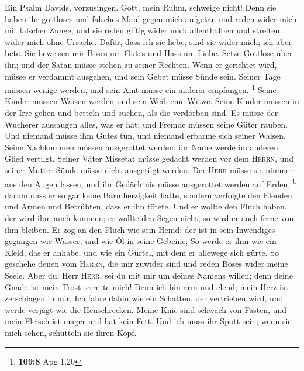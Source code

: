  Ein Psalm Davids, vorzusingen. Gott, mein Ruhm, schweige
nicht!  Denn sie haben ihr gottloses und falsches Maul
gegen mich aufgetan und reden wider mich mit falscher Zunge;
 und sie reden giftig wider mich allenthalben und streiten
wider mich ohne Ursache.  Dafür, dass ich sie liebe, sind
sie wider mich; ich aber bete.  Sie beweisen mir Böses um
Gutes und Hass um Liebe.  Setze Gottlose über ihn; und der
Satan müsse stehen zu seiner Rechten.  Wenn er gerichtet
wird, müsse er verdammt ausgehen, und sein Gebet müsse Sünde sein.
 Seiner Tage müssen wenige werden, und sein Amt müsse ein
anderer empfangen. \footnote{\textbf{109:8} Apg 1,20} 
Seine Kinder müssen Waisen werden und sein Weib eine Witwe.
 Seine Kinder müssen in der Irre gehen und betteln und
suchen, als die verdorben sind.  Es müsse der Wucherer
aussaugen alles, was er hat; und Fremde müssen seine Güter rauben.
 Und niemand müsse ihm Gutes tun, und niemand erbarme
sich seiner Waisen.  Seine Nachkommen müssen ausgerottet
werden; ihr Name werde im anderen Glied vertilgt.  Seiner
Väter Missetat müsse gedacht werden vor dem \textsc{Herrn}, und seiner
Mutter Sünde müsse nicht ausgetilgt werden.  Der
\textsc{Herr} müsse sie nimmer aus den Augen lassen, und ihr Gedächtnis
müsse ausgerottet werden auf Erden, \textsuperscript{b} 
darum dass er so gar keine Barmherzigkeit hatte, sondern verfolgte den
Elenden und Armen und Betrübten, dass er ihn tötete.  Und
er wollte den Fluch haben, der wird ihm auch kommen; er wollte den Segen
nicht, so wird er auch ferne von ihm bleiben.  Er zog an
den Fluch wie sein Hemd; der ist in sein Inwendiges gegangen wie Wasser,
und wie Öl in seine Gebeine;  So werde er ihm wie ein
Kleid, das er anhabe, und wie ein Gürtel, mit dem er allewege sich
gürte.  So geschehe denen vom \textsc{Herrn}, die mir
zuwider sind und reden Böses wider meine Seele.  Aber du,
Herr \textsc{Herr}, sei du mit mir um deines Namens willen; denn deine
Gnade ist mein Trost: errette mich!  Denn ich bin arm und
elend; mein Herz ist zerschlagen in mir.  Ich fahre dahin
wie ein Schatten, der vertrieben wird, und werde verjagt wie die
Heuschrecken.  Meine Knie sind schwach von Fasten, und
mein Fleisch ist mager und hat kein Fett.  Und ich muss
ihr Spott sein; wenn sie mich sehen, schütteln sie ihren Kopf.

